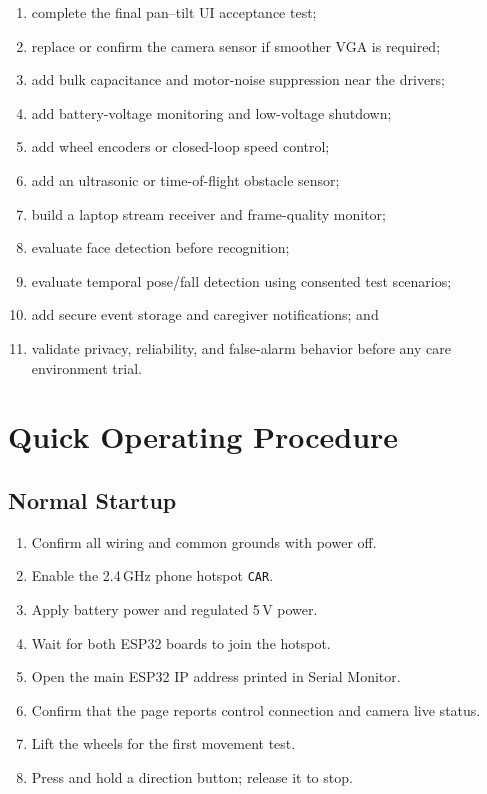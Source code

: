 \documentclass[12pt,a4paper,oneside]{report}
\newcommand{\code}[1]{\texttt{#1}}
\begin{document}
\begin{enumerate}
  \item complete the final pan--tilt UI acceptance test;
  \item replace or confirm the camera sensor if smoother VGA is required;
  \item add bulk capacitance and motor-noise suppression near the drivers;
  \item add battery-voltage monitoring and low-voltage shutdown;
  \item add wheel encoders or closed-loop speed control;
  \item add an ultrasonic or time-of-flight obstacle sensor;
  \item build a laptop stream receiver and frame-quality monitor;
  \item evaluate face detection before recognition;
  \item evaluate temporal pose/fall detection using consented test scenarios;
  \item add secure event storage and caregiver notifications; and
  \item validate privacy, reliability, and false-alarm behavior before any care
        environment trial.
\end{enumerate}

\appendix
\chapter{Quick Operating Procedure}

\section{Normal Startup}
\begin{enumerate}
  \item Confirm all wiring and common grounds with power off.
  \item Enable the 2.4\,GHz phone hotspot \code{CAR}.
  \item Apply battery power and regulated 5\,V power.
  \item Wait for both ESP32 boards to join the hotspot.
  \item Open the main ESP32 IP address printed in Serial Monitor.
  \item Confirm that the page reports control connection and camera live status.
  \item Lift the wheels for the first movement test.
  \item Press and hold a direction button; release it to stop.
\end{enumerate}
\end{document}
